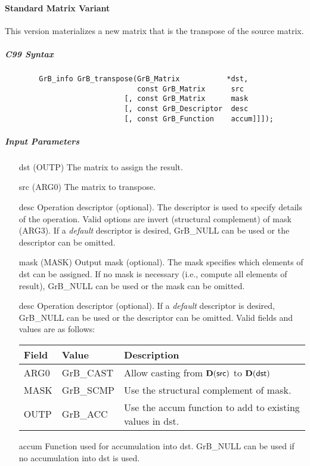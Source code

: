 \paragraph{Standard Matrix Variant}

This version materializes a new matrix that is the transpose of the source matrix.

\subparagraph{C99 Syntax}

\begin{verbatim}
        GrB_info GrB_transpose(GrB_Matrix           *dst,
                               const GrB_Matrix      src
                            [, const GrB_Matrix      mask
                            [, const GrB_Descriptor  desc
                            [, const GrB_Function    accum]]]);
\end{verbatim}

\subparagraph{Input Parameters}

\begin{itemize}
    \item[{\sf dst}]   ({\sf OUTP}) The matrix to assign the result.
    \item[{\sf src}]   ({\sf ARG0}) The matrix to transpose.

    \item[{\sf desc}]  Operation descriptor (optional). The descriptor
    is used to specify details of the operation. Valid options are 
    invert (structural complement) of mask ({\sf ARG3}). If
    a \emph{default} descriptor is desired,    {\sf GrB\_NULL} can be
    used or the descriptor can be omitted.

    \item[{\sf mask}]  (MASK) Output mask (optional). The mask
    specifies which elements of {\sf dst} can be assigned.
    If no mask is necessary (i.e., compute all elements of result),
    {\sf GrB\_NULL} can be used or the mask can be omitted.

    \item[{\sf desc}]   Operation descriptor (optional). If a
    \emph{default} descriptor is desired, {\sf GrB\_NULL} can be
    used or the descriptor can be omitted.  Valid fields and values are as follows: \\
    \begin{tabular}{lll}
    Field  & Value & Description \\
    \hline
    {\sf ARG0} & {\sf GrB\_CAST} & Allow casting from $\bold{D}({\sf src})$ to $\bold{D}({\sf dst})$ \\
    {\sf MASK} & {\sf GrB\_SCMP} & Use the structural complement of {\sf mask}. \\
    {\sf OUTP}& {\sf GrB\_ACC}  & Use the {\sf accum} function to add to existing values in {\sf dst}.\\
    \end{tabular}

    \item[{\sf accum}] Function used for accumulation into dst.  {\sf GrB\_NULL}
                       can be used if no accumulation into dst is used.
\end{itemize}

